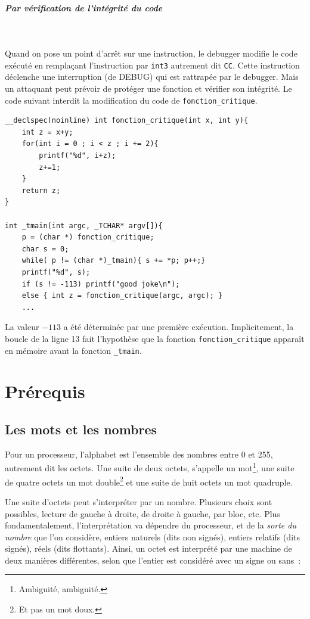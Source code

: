 \documentclass{book}
\newcommand{\code}[1]{\texttt{#1}}
\begin{document}
\paragraph{Par vérification de l'intégrité du code}~

\medskip
Quand on pose un point d'arrêt sur une instruction, le debugger modifie le code exécuté en remplaçant l'instruction par 
\texttt{int3}
autrement dit \code{CC}. Cette instruction déclenche une interruption (de DEBUG) qui est rattrapée par le debugger. Mais un attaquant peut prévoir de protéger une fonction et vérifier son intégrité. Le code suivant interdit la modification du code de \code{fonction\_critique}.

\begin{verbatim}
__declspec(noinline) int fonction_critique(int x, int y){
	int z = x+y;
	for(int i = 0 ; i < z ; i += 2){
		printf("%d", i+z);
		z+=1;
	}
	return z;
}

int _tmain(int argc, _TCHAR* argv[]){	
	p = (char *) fonction_critique;
	char s = 0;
	while( p != (char *)_tmain){ s += *p; p++;}
	printf("%d", s);
	if (s != -113) printf("good joke\n");
	else { int z = fonction_critique(argc, argc); }
	...
\end{verbatim}

La valeur $-113$ a été déterminée par une première exécution. Implicitement, la boucle de la ligne 13 fait l'hypothèse que la fonction \code{fonction\_critique} apparaît en mémoire avant la fonction \code{\_tmain}. 






	

\chapter{Prérequis}

\section{Les mots et les nombres}

Pour un processeur, l'alphabet est l'ensemble des nombres entre 0 et 255, autrement dit les octets.
Une suite de deux octets, s'appelle un mot\footnote{Ambiguité, ambiguité.}, une suite de quatre octets un mot double\footnote{Et pas un mot doux.} et une suite de huit octets un mot quadruple.

Une suite d'octets peut s'interpréter par un nombre. Plusieurs choix sont possibles, lecture de gauche à droite, de droite à gauche, par bloc, etc. Plus fondamentalement, l'interprétation va dépendre du processeur, et de la \emph{sorte du nombre} que l'on considère, entiers naturels (dits non signés), entiers relatifs (dits signés), réels (dits flottants).  Ainsi, un octet est interprété par une machine de deux manières différentes, selon que l'entier est considéré avec un signe ou sans~: 
\end{document}
